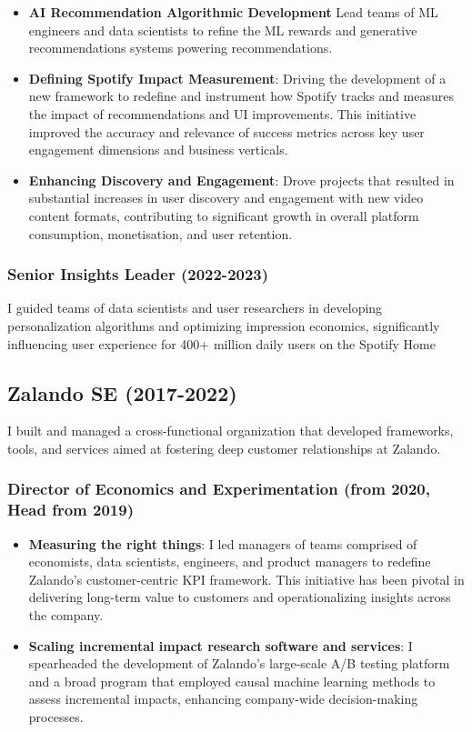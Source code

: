 \documentclass[a4paper]{article}
\begin{document}
\begin{itemize}
    \item \textbf{AI Recommendation Algorithmic Development} Lead teams of ML engineers and data scientists to refine the ML rewards and generative recommendations systems powering recommendations.  
    \item \textbf{Defining Spotify Impact Measurement}: Driving the development of a new framework to redefine and instrument how Spotify tracks and measures the impact of recommendations and UI improvements. This initiative improved the accuracy and relevance of success metrics across key user engagement dimensions and business verticals.
    \item \textbf{Enhancing Discovery and Engagement}: Drove projects that resulted in substantial increases in user discovery and engagement with new video content formats, contributing to significant growth in overall platform consumption, monetisation, and user retention.
\end{itemize}

\subsubsection*{Senior Insights Leader (2022-2023)}

I guided teams of data scientists and user researchers in developing personalization algorithms and optimizing impression economics, significantly influencing user experience for 400+ million daily users on the Spotify Home

\subsection*{Zalando SE (2017-2022)}

I built and managed a cross-functional organization that developed frameworks, tools, and services aimed at fostering deep customer relationships at Zalando.

\subsubsection*{Director of Economics and Experimentation (from 2020, Head from 2019)}

\begin{itemize}
    \item \textbf{Measuring the right things}: I led managers of teams comprised of economists, data scientists, engineers, and product managers to redefine Zalando's customer-centric KPI framework. This initiative has been pivotal in delivering long-term value to customers and operationalizing insights across the company.
    \item \textbf{Scaling incremental impact research software and services}: I spearheaded the development of Zalando's large-scale A/B testing platform and a broad program that employed causal machine learning methods to assess incremental impacts, enhancing company-wide decision-making processes.
\end{itemize}
\end{document}
